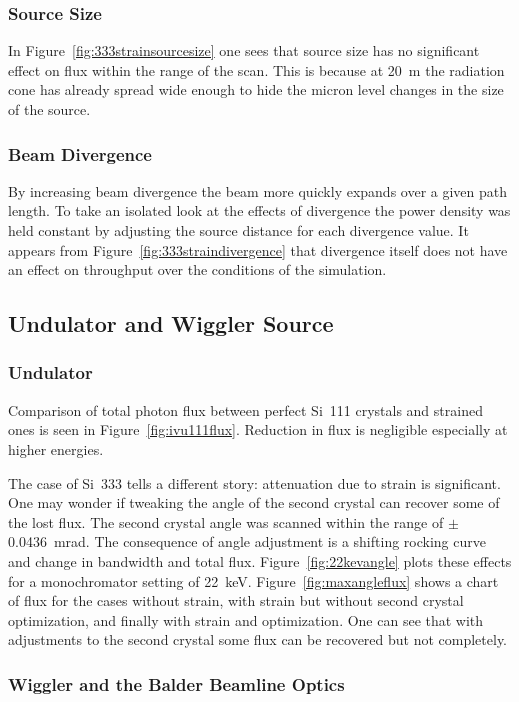 \documentclass[preprint]{iucr}              %
\begin{document}
\subsubsection{Source Size}
In Figure~\ref{fig:333strainsourcesize} one sees that source size has no significant effect on flux within the range of the scan. This is because at 20~m the radiation cone has already spread wide enough to hide the micron level changes in the size of the source.

\subsubsection{Beam Divergence}
By increasing beam divergence the beam more quickly expands over a given path length. To take an isolated look at the effects of divergence the power density was held constant by adjusting the source distance for each divergence value. It appears from Figure~\ref{fig:333straindivergence} that divergence itself does not have an effect on throughput over the conditions of the simulation.

\subsection{Undulator and Wiggler Source}\label{undulatorwiggler}

\subsubsection{Undulator}
Comparison of total photon flux between perfect Si~111 crystals and strained ones is seen in Figure~\ref{fig:ivu111flux}. Reduction in flux is negligible especially at higher energies.

The case of Si~333 tells a different story: attenuation due to strain is significant. One may wonder if tweaking the angle of the second crystal can recover some of the lost flux. The second crystal angle was scanned within the range of $\pm$ 0.0436~mrad. The consequence of angle adjustment is a shifting rocking curve and change in bandwidth and total flux. Figure~\ref{fig:22kevangle} plots these effects for a monochromator setting of 22~keV. Figure~\ref{fig:maxangleflux} shows a chart of flux for the cases without strain, with strain but without second crystal optimization, and finally with strain and optimization. One can see that with adjustments to the second crystal some flux can be recovered but not completely.

\subsubsection{Wiggler and the Balder Beamline Optics}
\end{document}
